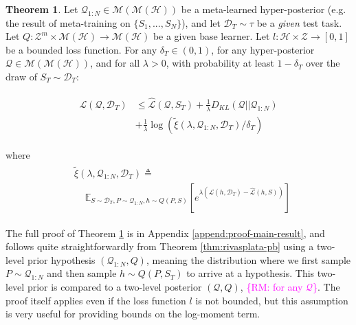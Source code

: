 \documentclass[letterpaper]{article} %
\theoremstyle{definition}
\newtheorem{theorem}{Theorem}[section]
\newcommand{\Expect}[2]{\mathbb{E}_{#1}\left [#2 \right ]}
\newcommand{\RM}[1]{\textcolor{magenta}{\{RM: #1\}}}
\begin{document}
\begin{theorem} \label{thm:main-result}
	Let $\mathcal{Q}_{1:N}\in \mathcal{M}(\mathcal{M}(\mathcal{H}))$ be a meta-learned hyper-posterior (e.g. the result of meta-training on $\{S_1,...,S_N\}$), and let $\mathcal{D}_T\sim \tau$ be a \emph{given} test task. Let $Q: \mathcal{Z}^m\times\mathcal{M}(\mathcal{H})\rightarrow \mathcal{M}(\mathcal{H})$ be a given base learner. Let $l: \mathcal{H}\times \mathcal{Z}\rightarrow [0, 1]$ be a bounded loss function.
	For any $\delta_T \in (0,1)$, for any hyper-posterior $\mathcal{Q}\in \mathcal{M}(\mathcal{M}(\mathcal{H}))$, and for all $\lambda>0$, with probability at least $1-\delta_T$ over the draw of $S_T\sim \mathcal{D}_T$:
	
	\begin{align} \label{eq:main-result-generic}
	\begin{split}
	\mathcal{L}(\mathcal{Q}, \mathcal{D}_T) &\leq \hat{\mathcal{L}}(\mathcal{Q}, S_T) + \frac{1}{\lambda}D_{KL}(\mathcal{Q}||\mathcal{Q}_{1:N})\\
	&+\frac{1}{\lambda}\log\left ( \tilde{\xi}(\lambda,\mathcal{Q}_{1:N},\mathcal{D}_T)/\delta_T\right )
	\end{split}
	\end{align}
	
	
	where 
	\begin{align*} 
	\begin{split}
	&\tilde{\xi}(\lambda,\mathcal{Q}_{1:N},\mathcal{D}_T)\triangleq \\
	&\;\;\;\; \Expect{S\sim \mathcal{D}_T, P\sim \mathcal{Q}_{1:N}, h\sim Q(P,S)}{e^{\lambda\left (\mathcal{L}(h, \mathcal{D}_T)-\hat{\mathcal{L}}(h, S)\right )}}
	\end{split}
	\end{align*}
	

\end{theorem}

The full proof of Theorem \ref{thm:main-result} is in Appendix \ref{append:proof-main-result}, and follows quite straightforwardly from Theorem \ref{thm:rivasplata-pb} using a two-level prior hypothesis $(\mathcal{Q}_{1:N}, Q)$, meaning the distribution where we first sample $P\sim \mathcal{Q}_{1:N}$ and then sample $h\sim Q(P, S_T)$ to arrive at a hypothesis. This two-level prior is compared to a two-level posterior $(\mathcal{Q}, Q)$, \RM{for any $\mathcal{Q}$}. The proof itself applies even if the loss function $l$ is not bounded, but this assumption is very useful for providing bounds on the log-moment term.
\end{document}
